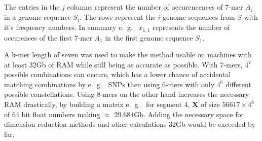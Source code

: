 The entries in the $j$ columns represent the number of occurencences of 7-mer $A_j$ in a genome sequence $S_i$. The rows represent the $i$ genome sequences from $S$ with it's frequency numbers. In summary e.~g.~ $x_{1,1}$ represents the number of occurences of the first 7-mer $A_1$ in the first genome sequence $S_1$.

A k-mer length of seven was used to make the method usable on machines with at least 32Gb of RAM while still being as accurate as possible. With 7-mers, $4^7$ possible combinations can occure, which has a lower chance of accidental matching combinations by e.~g.~ \glspl{SNP} then using 6-mers with only $4^6$ different possible constellations. Using 8-mers on the other hand increases the necessary RAM drastically, by building a matrix e.~g.~ for segment 4, $\mathbf{X}$ of size $56617 \times 4^8$ of 64 bit float numbers making $\approx$ 29.684Gb. Adding the necessary space for dimension reduction methods and other calculations 32Gb would be exceeded by far. 